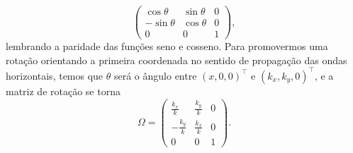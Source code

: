 \begin{equation*}
\begin{pmatrix}
\cos\theta&\sin\theta&0\\
-\sin\theta&\cos\theta&0\\
0&0&1
\end{pmatrix},
\end{equation*}
lembrando a paridade das fun\c{c}\~oes seno e cosseno. Para promovermos uma rota\c{c}\~ao orientando a primeira coordenada  no sentido de propaga\c{c}\~ao das ondas horizontais, temos que $\theta$ ser\'a o \^angulo entre $(x,0,0)^\top$ e $(k_x,k_y,0)^\top$, e a matriz de rota\c{c}\~ao se torna
\begin{equation}\label{eq.operador_rotacao}
\Omega=
\begin{pmatrix}
\frac{k_x}{k}&\frac{k_y}{k}&0\\
-\frac{k_y}{k}&\frac{k_x}{k}&0\\
0&0&1
\end{pmatrix}.
\end{equation}
